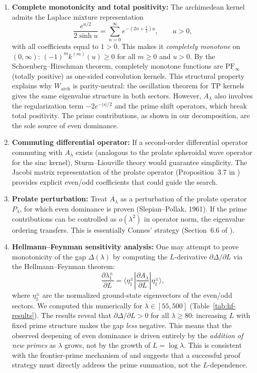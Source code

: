\documentclass[12pt,a4paper]{article}
\theoremstyle{definition}
\theoremstyle{remark}
\begin{document}
\begin{enumerate}[label=(\Alph*)]
  \item \textbf{Complete monotonicity and total positivity:} The archimedean kernel admits the Laplace mixture representation
  \[ \frac{e^{u/2}}{2\sinh u} = \sum_{n=0}^\infty e^{-(2n+\frac{1}{2})u}, \qquad u > 0, \]
  with all coefficients equal to $1 > 0$. This makes it \emph{completely monotone} on $(0,\infty)$: $(-1)^m k^{(m)}(u) \geq 0$ for all $m \geq 0$ and $u > 0$. By the Schoenberg--Hirschman theorem, completely monotone functions are $\mathrm{PF}_\infty$ (totally positive) as one-sided convolution kernels. This structural property explains why $W_{\mathrm{arch}}$ is parity-neutral: the oscillation theorem for TP kernels gives the same eigenvalue structure in both sectors. However, $A_\lambda$ also involves the regularization term $-2e^{-|s|/2}$ and the prime shift operators, which break total positivity. The prime contributions, as shown in our decomposition, are the sole source of even dominance.

  \item \textbf{Commuting differential operator:} If a second-order differential operator commuting with $A_\lambda$ exists (analogous to the prolate spheroidal wave operator for the sinc kernel), Sturm--Liouville theory would guarantee simplicity. The Jacobi matrix representation of the prolate operator (Proposition~3.7 in \cite{ConnesMoscovici2023}) provides explicit even/odd coefficients that could guide the search.

  \item \textbf{Prolate perturbation:} Treat $A_\lambda$ as a perturbation of the prolate operator $P_\lambda$, for which even dominance is proven (Slepian--Pollak, 1961). If the prime contributions can be controlled as $o(\lambda^2)$ in operator norm, the eigenvalue ordering transfers. This is essentially Connes' strategy (Section~6.6 of \cite{Connes2026}).

  \item \textbf{Hellmann--Feynman sensitivity analysis:} One may attempt to prove monotonicity of the gap $\Delta(\lambda)$ by computing the $L$-derivative $\partial\Delta/\partial L$ via the Hellmann--Feynman theorem:
  \[ \frac{\partial \lambda_1^\pm}{\partial L} = \langle \eta_1^\pm | \frac{\partial A_\lambda}{\partial L} | \eta_1^\pm \rangle, \]
  where $\eta_1^\pm$ are the normalized ground-state eigenvectors of the even/odd sectors.
  We computed this numerically for $\lambda \in [55, 500]$ (Table~\ref{tab:hf-results}). The results reveal that $\partial\Delta/\partial L > 0$ for all $\lambda \geq 80$: increasing $L$ with fixed prime structure makes the gap \emph{less} negative. This means that the observed deepening of even dominance is driven entirely by the \emph{addition of new primes} as $\lambda$ grows, not by the growth of $L = \log\lambda$. This is consistent with the frontier-prime mechanism of  and suggests that a successful proof strategy must directly address the prime summation, not the $L$-dependence.
\end{enumerate}
\end{document}
